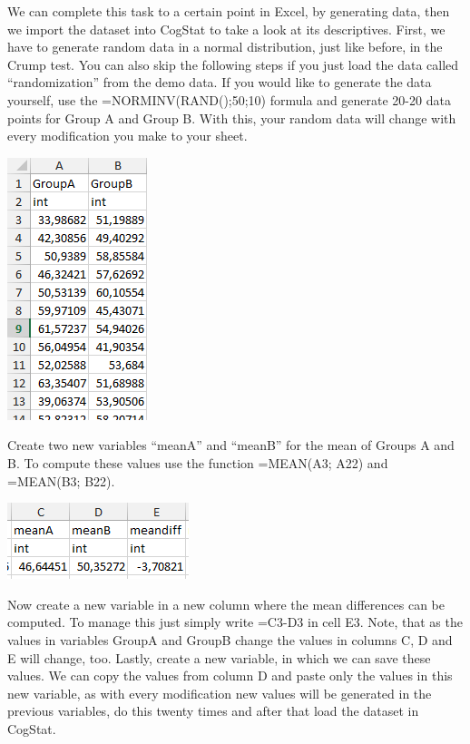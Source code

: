 \documentclass[
]{book}
\begin{document}
We can complete this task to a certain point in Excel, by generating data, then we import the dataset into CogStat to take a look at its descriptives. First, we have to generate random data in a normal distribution, just like before, in the Crump test. You can also skip the following steps if you just load the data called ``randomization'' from the demo data. If you would like to generate the data yourself, use the =NORMINV(RAND();50;10) formula and generate 20-20 data points for Group A and Group B. With this, your random data will change with every modification you make to your sheet.

\includegraphics{img/ch5/5.4Gab.png}

Create two new variables ``meanA'' and ``meanB'' for the mean of Groups A and B. To compute these values use the function =MEAN(A3; A22) and =MEAN(B3; B22).

\includegraphics{img/ch5/5.4meandiff.png}

Now create a new variable in a new column where the mean differences can be computed. To manage this just simply write =C3-D3 in cell E3. Note, that as the values in variables GroupA and GroupB change the values in columns C, D and E will change, too. Lastly, create a new variable, in which we can save these values. We can copy the values from column D and paste only the values in this new variable, as with every modification new values will be generated in the previous variables, do this twenty times and after that load the dataset in CogStat.
\end{document}
